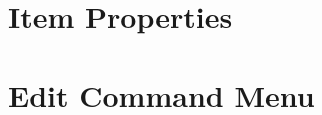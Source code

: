 \chapter{Item Properties}
\label{chpt:ItemProperties}
\chapter{Edit Command Menu}
\label{chpt:EditCommandMenu}
